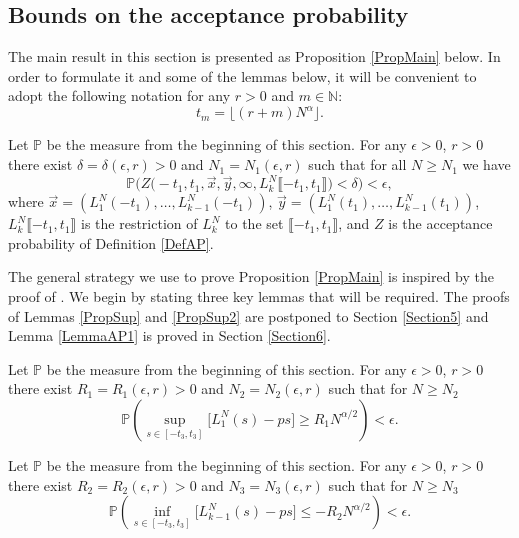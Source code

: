 \subsection{Bounds on the acceptance probability}\label{Section4.1}
The main result in this section is presented as Proposition \ref{PropMain} below. In order to formulate it and some of the lemmas below, it will be convenient to adopt the following notation for any $r > 0$ and $m \in \mathbb{N}$:
\begin{equation}\label{eqsts}
t_m =\lfloor (r+m) N^{\alpha} \rfloor.
\end{equation}
\begin{proposition}\label{PropMain} Let $\mathbb{P}$ be the measure from the beginning of this section. For any $\epsilon > 0$, $r > 0$ there exist $\delta = \delta(\epsilon, r) > 0$ and $N_1 = N_1(\epsilon, r)$ such that for all $N \geq N_1$
	we have 
	$$\mathbb{P}\Big(Z\big( -t_1, t_1, \vec{x}, \vec{y} , \infty,  L^N_{k}\llbracket -t_1, t_1\rrbracket\big) < \delta\Big) < \epsilon,$$
	where $\vec{x} = (L_1^N(-t_1), \dots, L_{k-1}^N(-t_1))$, $\vec{y} = (L_1^N(t_1), \dots, L^N_{k-1}(t_1))$,  $ L^N_{k}\llbracket -t_1, t_1\rrbracket$ is the restriction of $L^N_k$ to the set $\llbracket -t_1, t_1\rrbracket$, and $Z$ is the acceptance probability of Definition \ref{DefAP}. 
\end{proposition}

The general strategy we use to prove Proposition \ref{PropMain} is inspired by the proof of \cite[Proposition 6.5]{CorHamK}. We begin by stating three key lemmas that will be required. The proofs of Lemmas \ref{PropSup} and \ref{PropSup2} are postponed to Section \ref{Section5} and Lemma \ref{LemmaAP1} is proved in Section \ref{Section6}.


\begin{lemma}\label{PropSup}  Let $\mathbb{P}$ be the measure from the beginning of this section. For any $\epsilon > 0$, $r > 0$ there exist $R_1=R_1(\epsilon,r) > 0$ and $N_2= N_2(\epsilon,r)$ such that for $N \geq N_2$ 
	$$\mathbb{P} \left( \sup_{s \in [ -t_3, t_3] }\big[ L^N_1(s) - p s \big] \geq  R_1N^{\alpha/2} \right) < \epsilon.$$
\end{lemma}

\begin{lemma}\label{PropSup2}  Let $\mathbb{P}$ be the measure from the beginning of this section.  For any $\epsilon > 0$, $r > 0$ there exist $R_2=R_2( \epsilon,r) > 0$ and $N_3=N_3(\epsilon,r)$ such that for $N \geq N_3$
	$$\mathbb{P}\left( \inf_{s \in [ -t_3, t_3 ]}\big[L^N_{k-1}(s) - p s \big] \leq - R_2N^{\alpha/2} \right) < \epsilon.$$
\end{lemma}

